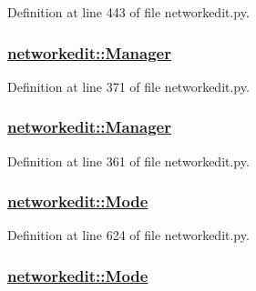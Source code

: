 Definition at line 443 of file networkedit.py.\hypertarget{namespacenetworkedit_cf4848f1a2b858ef442d2bcb3a348af1}{
\subsubsection[Manager]{\setlength{\rightskip}{0pt plus 5cm}\hyperlink{namespacenetworkedit_cf4848f1a2b858ef442d2bcb3a348af1}{networkedit::Manager}}}
\label{namespacenetworkedit_cf4848f1a2b858ef442d2bcb3a348af1}




Definition at line 371 of file networkedit.py.\hypertarget{namespacenetworkedit_cf4848f1a2b858ef442d2bcb3a348af1}{
\subsubsection[Manager]{\setlength{\rightskip}{0pt plus 5cm}\hyperlink{namespacenetworkedit_cf4848f1a2b858ef442d2bcb3a348af1}{networkedit::Manager}}}
\label{namespacenetworkedit_cf4848f1a2b858ef442d2bcb3a348af1}




Definition at line 361 of file networkedit.py.\hypertarget{namespacenetworkedit_6d69d76b8b1b34286bca7d797b7d9053}{
\subsubsection[Mode]{\setlength{\rightskip}{0pt plus 5cm}\hyperlink{namespacenetworkedit_6d69d76b8b1b34286bca7d797b7d9053}{networkedit::Mode}}}
\label{namespacenetworkedit_6d69d76b8b1b34286bca7d797b7d9053}




Definition at line 624 of file networkedit.py.\hypertarget{namespacenetworkedit_6d69d76b8b1b34286bca7d797b7d9053}{
\subsubsection[Mode]{\setlength{\rightskip}{0pt plus 5cm}\hyperlink{namespacenetworkedit_6d69d76b8b1b34286bca7d797b7d9053}{networkedit::Mode}}}
\label{namespacenetworkedit_6d69d76b8b1b34286bca7d797b7d9053}




